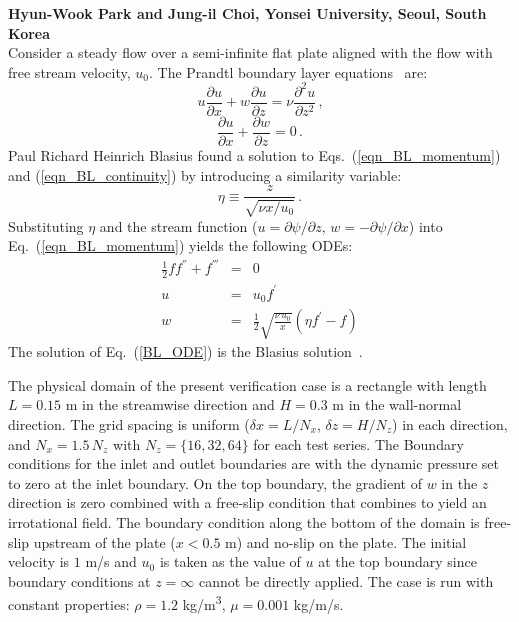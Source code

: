 \documentclass[11pt]{book}
\begin{document}
\textbf{Hyun-Wook Park and Jung-il Choi, Yonsei University, Seoul, South Korea}\\

\noindent Consider a steady flow over a semi-infinite flat plate aligned with the flow with free stream velocity, $u_0$. The Prandtl boundary layer equations~\cite{Panton:1} are:
\begin{equation}
\label{eqn_BL_momentum}
u \frac{\partial u}{\partial x} + w \frac{\partial u}{\partial z} = \nu \frac{\partial^2 u}{\partial z^2} \,\mbox{,}
\end{equation}
\begin{equation}
\label{eqn_BL_continuity}
\frac{\partial u}{\partial x}+\frac{\partial w}{\partial z} = 0 \,\mbox{.}
\end{equation}
Paul Richard Heinrich Blasius found a solution to Eqs.~(\ref{eqn_BL_momentum}) and (\ref{eqn_BL_continuity}) by introducing a similarity variable:
\begin{equation}
\label{eta}
\eta\equiv\frac{z}{\sqrt{\nu x/u_0}} \,\mbox{.}
\end{equation}
Substituting $\eta$ and the stream function ($u = \partial \psi/\partial z$, $w = -\partial \psi/\partial x$) into Eq.~(\ref{eqn_BL_momentum}) yields the following ODEs:
\begin{eqnarray}
\label{BL_ODE}
\frac{1}{2}f f^{''}+f^{'''}&=&0 \\
u&=&u_0 f^{'} \\
w&=&\frac{1}{2}\sqrt{\frac{\nu \,u_0}{x}}(\eta f^{'}-f)
\end{eqnarray}
The solution of Eq.~(\ref{BL_ODE}) is the Blasius solution~\cite{Panton:1}.

The physical domain of the present verification case is a rectangle with length $L=0.15$ m in the streamwise direction and $H=0.3$ m in the wall-normal direction. The grid spacing is uniform ($\delta x = L/N_x$, $\delta z =H/N_z$) in each direction, and $N_x = 1.5 \, N_z$ with $N_z = \{16, 32, 64\}$ for each test series. The Boundary conditions for the inlet and outlet boundaries are  with the dynamic pressure set to zero at the inlet boundary. On the top boundary, the gradient of $w$ in the $z$ direction is zero combined with a free-slip condition that combines to yield an irrotational field. The boundary condition along the bottom of the domain is free-slip upstream of the plate ($x<0.5$ m) and no-slip on the plate. The initial velocity is $1$ m/s and $u_0$ is taken as the value of $u$ at the top boundary since boundary conditions at $z=\infty$ cannot be directly applied. The case is run with constant properties: $\rho=1.2$ \si{kg/m^3}, $\mu = 0.001$ kg/m/s.
\end{document}
